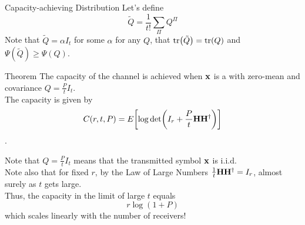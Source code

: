 \begin{frame}[allowframebreaks]{Capacity-achieving Distribution}
\medskip
Let's define
$$\tilde{Q} = \frac{1}{t!}\sum_\Pi Q^\Pi$$
Note that $\tilde{Q}=\alpha I_t$ for some $\alpha$ for any $Q$, that $\tr(\tilde{Q})=\tr(Q)$ and $\Psi(\tilde{Q})\geq\Psi(Q)$.

\framebreak

\begin{alertblock}{Theorem}
	The capacity of the channel is achieved when $\vb{x}$ is a \cscg{} with zero-mean and covariance $Q=\frac{P}{t}I_t$.\\
	The capacity is given by
	$$C(r,t,P) = E_{}\qty[\log\det(I_r + \frac{P}{t}\vb{H\ensuremath{H^\dagger}})]$$.
\end{alertblock}

Note that $Q=\frac{P}{t}I_t$ means that the transmitted symbol $\vb{x}$ is i.i.d.\\
Note also that for fixed $r$, by the Law of Large Numbers $\frac{1}{t}\vb{H\ensuremath{H^\dagger}} = I_r$, almost surely as $t$ gets large.\\ Thus, the capacity in the limit of large $t$ equals
$$r\log(1+P)$$
which scales linearly with the number of receivers!

\end{frame}

